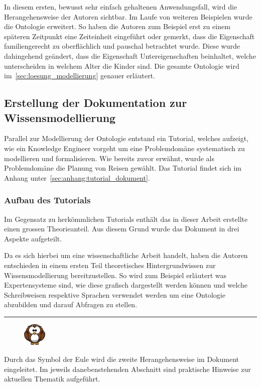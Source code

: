 In diesem ersten, bewusst sehr einfach gehaltenen Anwendungsfall, wird die Herangehensweise der Autoren sichtbar. Im Laufe von weiteren Beispielen wurde die Ontologie erweitert. So haben die Autoren zum Beispiel erst zu einem späteren Zeitpunkt eine Zeiteinheit eingeführt oder gemerkt, dass die Eigenschaft familiengerecht zu oberflächlich und pauschal betrachtet wurde. Diese wurde dahingehend geändert, dass die Eigenschaft Untereigenschaften beinhaltet, welche unterscheiden in welchem Alter die Kinder sind. Die gesamte Ontologie wird im~\autoref{sec:loesung_modellierung} genauer erläutert.

\subsection{Erstellung der Dokumentation zur Wissensmodellierung}
\label{subsec:dokumentation_wissensmodellierung}
Parallel zur Modellierung der Ontologie entstand ein Tutorial, welches aufzeigt, wie ein Knowledge Engineer vorgeht um eine Problemdomäne systematisch zu modellieren und formalisieren. Wie bereits zuvor erwähnt, wurde als Problemdomäne die Planung von Reisen gewählt. Das Tutorial findet sich im Anhang unter~\ref{sec:anhang:tutorial_dokument}.

\subsubsection{Aufbau des Tutorials}
\label{subsec:dokumentation_wissensmodellierung_aufbau}
Im Gegensatz zu herkömmlichen Tutorials enthält das in dieser Arbeit erstellte einen grossen Theorieanteil. Aus diesem Grund wurde das Dokument in drei Aspekte aufgeteilt.

Da es sich hierbei um eine wissenschaftliche Arbeit handelt, haben die Autoren entschieden in einem ersten Teil theoretisches Hintergrundwissen zur Wissensmodellierung bereitzustellen. So wird zum Beispiel erläutert was Expertensysteme sind, wie diese grafisch dargestellt werden können und welche Schreibweisen respektive Sprachen verwendet werden um eine Ontologie abzubilden und darauf Abfragen zu stellen.

\noindent\rule[1ex]{\textwidth}{1pt}
\begin{figure}
    \vspace{-18pt}
    \includegraphics[width=0.1\textwidth]{bilder/owl.png}\protect\footnotemark{}
\end{figure}
Durch das Symbol der Eule wird die zweite Herangehensweise im Dokument eingeleitet. Im jeweils danebenstehenden Abschnitt sind praktische Hinweise zur aktuellen Thematik aufgeführt.\\

